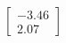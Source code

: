 \documentclass[preview]{standalone}
\begin{document}
\begin{align*}
\begin{bmatrix} -3.46 \\ 2.07 \end{bmatrix}
\end{align*}
\end{document}
